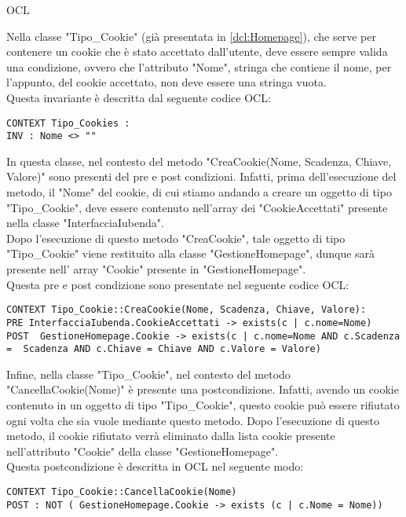 \begin{listaPersonale}{OCL}
        \begin{center}
            
        \end{center}
        Nella classe "Tipo\_Cookie" (già presentata in \ref{dcl:Homepage}), che serve per contenere un cookie che è stato accettato dall'utente, deve essere sempre valida una condizione, ovvero che l'attributo "Nome", stringa che contiene il nome, per l'appunto, del cookie accettato, non deve essere una stringa vuota.\\
        Questa invariante è descritta dal seguente codice OCL:
        \begin{lstlisting}
CONTEXT Tipo_Cookies :
INV : Nome <> "" 
    \end{lstlisting}
        In questa classe, nel contesto del metodo "CreaCookie(Nome, Scadenza, Chiave, Valore)" sono presenti del pre e post condizioni. Infatti, prima dell'esecuzione del metodo, il "Nome" del cookie, di cui stiamo andando a creare un oggetto di tipo "Tipo\_Cookie", deve essere contenuto nell'array dei "CookieAccettati" presente nella classe "InterfacciaIubenda".\\
        Dopo l'esecuzione di questo metodo "CreaCookie", tale oggetto di tipo "Tipo\_Cookie" viene restituito alla classe "GestioneHomepage", dunque sarà presente nell' array "Cookie" presente in "GestioneHomepage".\\
        Questa pre e post condizione sono presentate nel seguente codice OCL:
        \begin{lstlisting}
CONTEXT Tipo_Cookie::CreaCookie(Nome, Scadenza, Chiave, Valore):
PRE InterfacciaIubenda.CookieAccettati -> exists(c | c.nome=Nome)
POST  GestioneHomepage.Cookie -> exists(c | c.nome=Nome AND c.Scadenza =  Scadenza AND c.Chiave = Chiave AND c.Valore = Valore) 
    \end{lstlisting}
        Infine, nella classe "Tipo\_Cookie", nel contesto del metodo "CancellaCookie(Nome)" è presente una postcondizione. Infatti, avendo un cookie contenuto in un oggetto di tipo "Tipo\_Cookie", questo cookie può essere rifiutato ogni volta che sia vuole mediante questo metodo. Dopo l'esecuzione di questo metodo, il cookie rifiutato verrà eliminato dalla lista cookie presente nell'attributo "Cookie" della classe "GestioneHomepage".\\
        Questa postcondizione è descritta in OCL nel seguente modo:

        \begin{lstlisting}
CONTEXT Tipo_Cookie::CancellaCookie(Nome)
POST : NOT ( GestioneHomepage.Cookie -> exists (c | c.Nome = Nome))
    \end{lstlisting}


\end{listaPersonale}
